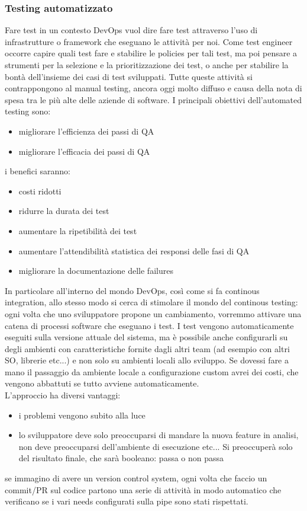 \documentclass{article}
\begin{document}
\subsubsection{Testing automatizzato}
Fare test in un contesto DevOps vuol dire fare test attraverso l'uso di infrastrutture o framework che eseguano le attività per noi. Come test engineer occorre capire quali test fare e stabilire le policies per tali test, ma poi pensare a strumenti per la selezione e la prioritizzazione dei test, o anche per stabilire la bontà dell'insieme dei casi di test sviluppati. Tutte queste attività si contrappongono al manual testing, ancora oggi molto diffuso e causa della nota di spesa tra le più alte delle aziende di software. I principali obiettivi dell'automated testing sono:
\begin{itemize}
\item migliorare l'efficienza dei passi di QA
\item migliorare l'efficacia dei passi di QA
\end{itemize}
i benefici saranno:
\begin{itemize}
\item costi ridotti
\item ridurre la durata dei test
\item aumentare la ripetibilità dei test
\item aumentare l'attendibilità statistica dei responsi delle fasi di QA
\item migliorare la documentazione delle failures
\end{itemize}
In particolare all'interno del mondo DevOps, così come si fa continous integration, allo stesso modo si cerca di stimolare il mondo del continous testing: ogni volta che uno sviluppatore propone un cambiamento, vorremmo attivare una catena di processi software che eseguano i test. I test vengono automaticamente eseguiti sulla versione attuale del sistema, ma è possibile anche configurarli su degli ambienti con caratteristiche fornite dagli altri team (ad esempio con altri SO, librerie etc...) e non solo su ambienti locali allo sviluppo. Se dovessi fare a mano il passaggio da ambiente locale a configurazione custom avrei dei costi, che vengono abbattuti se tutto avviene automaticamente.\\ L'approccio ha diversi vantaggi:
\begin{itemize}
\item i problemi vengono subito alla luce
\item lo sviluppatore deve solo preoccuparsi di mandare la nuova feature in analisi, non deve preoccuparsi dell'ambiente di esecuzione etc... Si preoccuperà solo del risultato finale, che sarà booleano: passa o non passa
\end{itemize} 
se immagino di avere un version control system, ogni volta che faccio un commit/PR sul codice partono una serie di attività in modo automatico che verificano se i vari needs configurati sulla pipe sono stati rispettati.
\end{document}
